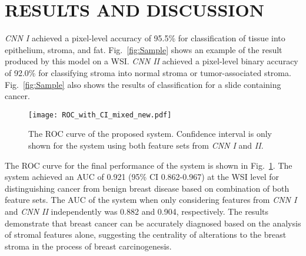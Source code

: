 \documentclass{article}
\begin{document}
\section{RESULTS AND DISCUSSION}
\vspace*{-6 pt}
\textit{CNN I} achieved a pixel-level accuracy of 95.5\% for classification of tissue into epithelium, stroma, and fat. Fig.~\ref{fig:Sample} shows an example of the result produced by this model on a WSI. \textit{CNN II} achieved a pixel-level binary accuracy of 92.0\% for classifying stroma into normal stroma or tumor-associated stroma. Fig.~\ref{fig:Sample} also shows the results of classification for a slide containing cancer. \iffalse The performance of the two networks significantly improved after each round of hard-negative mining. Our data augmentation strategy played a crucial role in achieving high generalization on the validation set. Jittering the color information makes the network robust to staining variations in pathology images. Moreover, our random real-time patch sampling strategy acts as a strong regularizer as well. This is because unlike the approaches that use offline extracted data to train their network, our network rarely sees the exact same patch again during the entire training process.\fi

\begin{figure}
	\centering
		\texttt{[image: ROC\_with\_CI\_mixed\_new.pdf]}
	\vspace{-1.0em}
	\caption{\footnotesize{The ROC curve of the proposed system. Confidence interval is only shown for the system using both feature sets from \textit{CNN I} and \textit{II}.}}
	\label{fig:ROC_curve}
	\vspace{-1.0em}
\end{figure}

The ROC curve for the final performance of the system is shown in Fig.~\ref{fig:ROC_curve}. The system achieved an AUC of 0.921 (95\% CI 0.862-0.967) at the WSI level for distinguishing cancer from benign breast disease based on combination of both feature sets. The AUC of the system when only considering features from \textit{CNN I} and \textit{CNN II }independently was 0.882 and 0.904, respectively. The results demonstrate that breast cancer can be accurately diagnosed based on the analysis of stromal features alone, suggesting the centrality of alterations to the breast stroma in the process of breast carcinogenesis.
\end{document}
